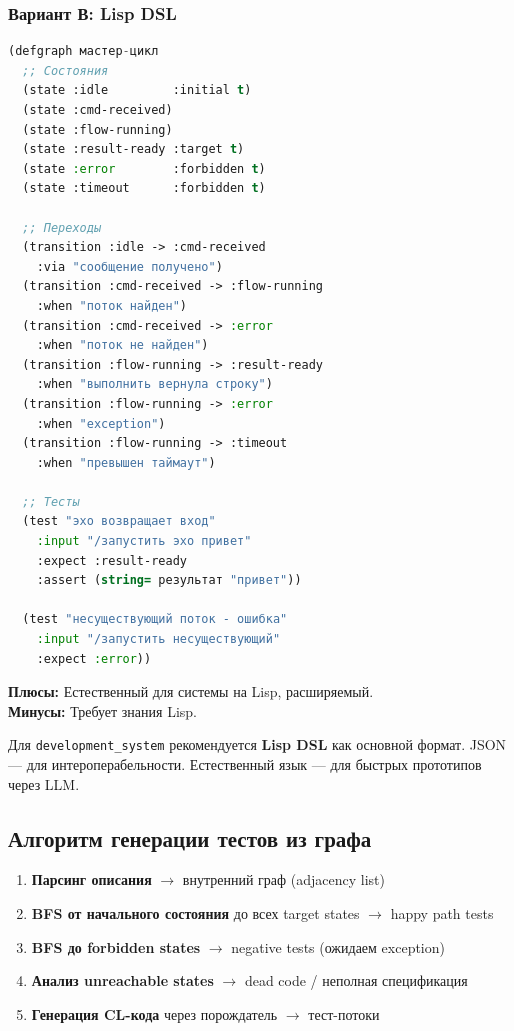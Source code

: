 \documentclass[10pt, oneside]{article}
\begin{document}
\subsubsection{Вариант В: Lisp DSL}

\begin{lstlisting}[language=CommonLisp,caption={Граф в Lisp DSL}]
(defgraph мастер-цикл
  ;; Состояния
  (state :idle         :initial t)
  (state :cmd-received)
  (state :flow-running)
  (state :result-ready :target t)
  (state :error        :forbidden t)
  (state :timeout      :forbidden t)

  ;; Переходы
  (transition :idle -> :cmd-received
    :via "сообщение получено")
  (transition :cmd-received -> :flow-running
    :when "поток найден")
  (transition :cmd-received -> :error
    :when "поток не найден")
  (transition :flow-running -> :result-ready
    :when "выполнить вернула строку")
  (transition :flow-running -> :error
    :when "exception")
  (transition :flow-running -> :timeout
    :when "превышен таймаут")

  ;; Тесты
  (test "эхо возвращает вход"
    :input "/запустить эхо привет"
    :expect :result-ready
    :assert (string= результат "привет"))

  (test "несуществующий поток - ошибка"
    :input "/запустить несуществующий"
    :expect :error))
\end{lstlisting}

\textbf{Плюсы:} Естественный для системы на Lisp, расширяемый.\\
\textbf{Минусы:} Требует знания Lisp.

\begin{successbox}[title={Рекомендация}]
Для \texttt{development\_system} рекомендуется \textbf{Lisp DSL} как основной
формат. JSON --- для интероперабельности. Естественный язык --- для быстрых
прототипов через LLM.
\end{successbox}

\subsection{Алгоритм генерации тестов из графа}

\begin{enumerate}[leftmargin=1.5em]
  \item \textbf{Парсинг описания} $\to$ внутренний граф (adjacency list)
  \item \textbf{BFS от начального состояния} до всех target states $\to$ happy path tests
  \item \textbf{BFS до forbidden states} $\to$ negative tests (ожидаем exception)
  \item \textbf{Анализ unreachable states} $\to$ dead code / неполная спецификация
  \item \textbf{Генерация CL-кода} через порождатель $\to$ тест-потоки
\end{enumerate}
\end{document}
